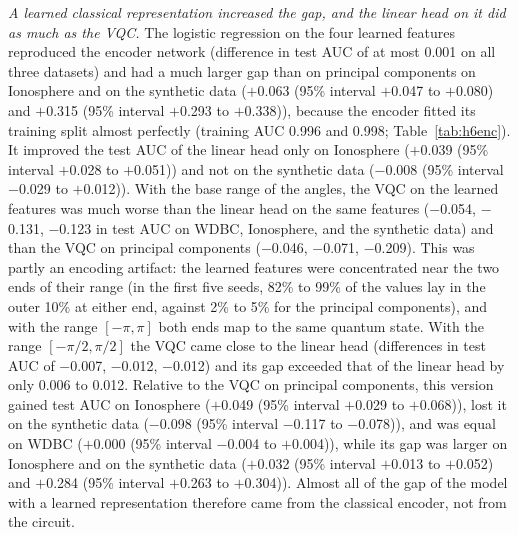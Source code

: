 \textit{A learned classical representation increased the gap, and the linear head on it did as much as the VQC.} The logistic regression on the four learned features reproduced the encoder network (difference in test AUC of at most 0.001 on all three datasets) and had a much larger gap than on principal components on Ionosphere and on the synthetic data ($+$0.063 (95\% interval $+$0.047 to $+$0.080) and $+$0.315 (95\% interval $+$0.293 to $+$0.338)), because the encoder fitted its training split almost perfectly (training AUC 0.996 and 0.998; Table~\ref{tab:h6enc}). It improved the test AUC of the linear head only on Ionosphere ($+$0.039 (95\% interval $+$0.028 to $+$0.051)) and not on the synthetic data ($-$0.008 (95\% interval $-$0.029 to $+$0.012)). With the base range of the angles, the VQC on the learned features was much worse than the linear head on the same features ($-$0.054, $-$0.131, $-$0.123 in test AUC on WDBC, Ionosphere, and the synthetic data) and than the VQC on principal components ($-$0.046, $-$0.071, $-$0.209). This was partly an encoding artifact: the learned features were concentrated near the two ends of their range (in the first five seeds, 82\% to 99\% of the values lay in the outer 10\% at either end, against 2\% to 5\% for the principal components), and with the range $[-\pi,\pi]$ both ends map to the same quantum state. With the range $[-\pi/2,\pi/2]$ the VQC came close to the linear head (differences in test AUC of $-$0.007, $-$0.012, $-$0.012) and its gap exceeded that of the linear head by only 0.006 to 0.012. Relative to the VQC on principal components, this version gained test AUC on Ionosphere ($+$0.049 (95\% interval $+$0.029 to $+$0.068)), lost it on the synthetic data ($-$0.098 (95\% interval $-$0.117 to $-$0.078)), and was equal on WDBC ($+$0.000 (95\% interval $-$0.004 to $+$0.004)), while its gap was larger on Ionosphere and on the synthetic data ($+$0.032 (95\% interval $+$0.013 to $+$0.052) and $+$0.284 (95\% interval $+$0.263 to $+$0.304)). Almost all of the gap of the model with a learned representation therefore came from the classical encoder, not from the circuit.


